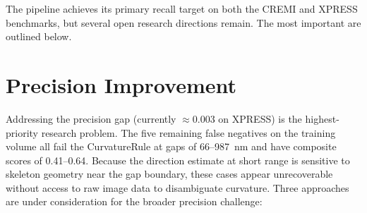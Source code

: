 The pipeline achieves its primary recall target on both the CREMI and XPRESS
benchmarks, but several open research directions remain. The most important
are outlined below.

\section{Precision Improvement}

Addressing the precision gap (currently $\approx$0.003 on XPRESS) is the
highest-priority research problem. The five remaining false negatives on the
training volume all fail the CurvatureRule at gaps of 66--987~nm and have
composite scores of 0.41--0.64.  Because the direction estimate at short range
is sensitive to skeleton geometry near the gap boundary, these cases appear
unrecoverable without access to raw image data to disambiguate curvature.
Three approaches are under consideration for the broader precision challenge:


